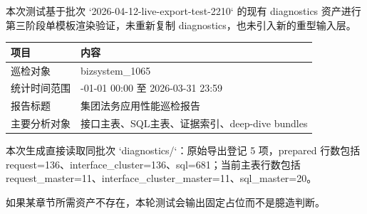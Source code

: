 
本次测试基于批次 `2026-04-12-live-export-test-2210` 的现有 diagnostics 资产进行第三阶段单模板渲染验证，未重新复制 diagnostics，也未引入新的重型输入层。\par


\begin{center}
\setlength{\tabcolsep}{4pt}
\renewcommand{\arraystretch}{1.6}
\begin{tabular}{>{\RaggedRight\arraybackslash}p{}>{\RaggedRight\arraybackslash}p{}}
\hline
\cellcolor{HeaderBlue}\color{white}\bfseries 项目 & \cellcolor{HeaderBlue}\color{white}\bfseries 内容 \\
\hline
巡检对象 & bizsystem\_1065 \\
\hline
统计时间范围 & 2026-01-01 00:00 至 2026-03-31 23:59 \\
\hline
报告标题 & 集团法务应用性能巡检报告 \\
\hline
主要分析对象 & 接口主表、SQL主表、证据索引、deep-dive bundles \\
\hline
\end{tabular}
\end{center}


本次生成直接读取同批次 `diagnostics/`：原始导出登记 5 项，prepared 行数包括 request=136、interface\_cluster=136、sql=681；当前主表行数包括 request\_master=11、interface\_cluster\_master=11、sql\_master=20。\par

如果某章节所需资产不存在，本轮测试会输出固定占位而不是臆造判断。\par
